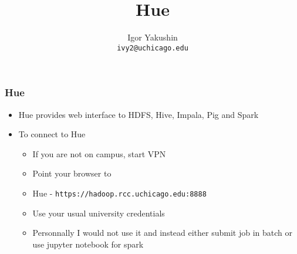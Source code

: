 \documentclass{beamer}
\title{\huge{Hue}}
\author{Igor Yakushin \\ \texttt{ivy2@uchicago.edu}}
\begin{document}



\begin{frame}
  \titlepage
\end{frame}


\begin{frame}[fragile]
  \frametitle{Hue}
  \begin{itemize}
  \item Hue provides web interface to HDFS, Hive, Impala, Pig and Spark
  \item To connect to Hue
    \begin{itemize}
    \item If you are not on campus, start VPN
    \item Point your browser to
    \item Hue - {\color{mycolorcli}\verb|https://hadoop.rcc.uchicago.edu:8888|}
    \item Use your usual university credentials
    \item Personnally I would not use it and instead either submit job in batch or use jupyter notebook for spark
    \end{itemize}
  \end{itemize}
\end{frame}
\end{document}
